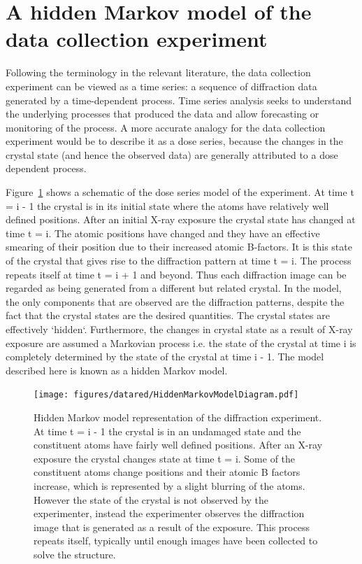 \section{A hidden Markov model of the data collection experiment}
\label{sec:A hidden Markov model of the data collection experiment}
Following the terminology in the relevant literature, the data collection experiment can be viewed as a time series: a sequence of diffraction data generated by a time-dependent process.
Time series analysis seeks to understand the underlying processes that produced the data and allow forecasting or monitoring of the process.
A more accurate analogy for the data collection experiment would be to describe it as a dose series, because the changes in the crystal state (and hence the observed data) are generally attributed to a dose dependent process.

Figure~\ref{fig:Hidden Markov Model diagram} shows a schematic of the dose series model of the experiment.
At time t = i - 1 the crystal is in its initial state where the atoms have relatively well defined positions.
After an initial X-ray exposure the crystal state has changed at time t = i.
The atomic positions have changed and they have an effective smearing of their position due to their increased atomic B-factors.
It is this state of the crystal that gives rise to the diffraction pattern at time t = i.
The process repeats itself at time t = i + 1 and beyond.
Thus each diffraction image can be regarded as being generated from a different but related crystal.
In the model, the only components that are observed are the diffraction patterns, despite the fact that the crystal states are the desired quantities.
The crystal states are effectively `hidden`.
Furthermore, the changes in crystal state as a result of X-ray exposure are assumed a Markovian process i.e. the state of the crystal at time i is completely determined by the state of the crystal at time i - 1.
The model described here is known as a hidden Markov model.
\begin{figure}[ht!]
    \centering
    \texttt{[image: figures/datared/HiddenMarkovModelDiagram.pdf]}
    \caption[Hidden Markov model representation of the diffraction experiment.]{Hidden Markov model representation of the diffraction experiment.
    At time t = i - 1 the crystal is in an undamaged state and the constituent atoms have fairly well defined positions.
    After an X-ray exposure the crystal changes state at time t = i.
    Some of the constituent atoms change positions and their atomic B factors increase, which is represented by a slight blurring of the atoms.
    However the state of the crystal is not observed by the experimenter, instead the experimenter observes the diffraction image that is generated as a result of the exposure.
    This process repeats itself, typically until enough images have been collected to solve the structure.}
    \label{fig:Hidden Markov Model diagram}
\end{figure}

